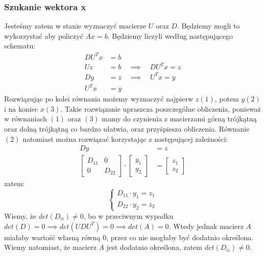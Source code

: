\documentclass{article}
\begin{document}
        \subsubsection*{Szukanie wektora x}
Jesteśmy zatem w stanie wyznaczyć macierze \(U\) oraz \(D\). Będziemy mogli to wykorzystać aby policzyć \(Ax = b\). Będziemy liczyli według następującego schematu:
\vspace*{0.2cm}
\[
    \begin{aligned}
        DU^Tx &= b \\
        Uz &= b \quad \implies \quad DU^Tx = z \\
        Dy &= z \quad \implies \quad U^Tx = y \\
        U^Tx &= y
    \end{aligned}
\]
Rozwiązując po kolei równania możemy wyznaczyć najpierw \(z (1)\), potem \(y (2)\) i na koniec \(x (3)\). Takie rozwiązanie upraszcza poszczególne obliczenia, ponieważ w równaniach \((1)\) oraz \((3)\) mamy do czynienia z macierzami górną trójkątną oraz dolną trójkątną co bardzo ułatwia, oraz przyśpiesza obliczenia. Równanie \((2)\) natomiast można rozwiązać korzystając z następującej zależności:
\[
    \begin{aligned}
        Dy &= z \\
        \begin{bmatrix}
            D_{11} & 0 \\
            0 & D_{22}
        \end{bmatrix}
        \cdot
        \begin{bmatrix}
            y_1 \\
            y_2
        \end{bmatrix}
        &=
        \begin{bmatrix}
            z_1 \\
            z_2
        \end{bmatrix}
    \end{aligned}
\]
zatem:
\[
    \begin{cases}
        D_{11} \cdot y_1 = z_1 \\
        D_{22} \cdot y_2 = z_2
    \end{cases}
\]
Wiemy, że \(det(D_{ii}) \ne 0\), bo w przeciwnym wypadku \(det(D) = 0 \implies det(UDU^T) = 0 \implies det(A) = 0\). Wtedy jednak macierz \(A\) miałaby wartość własną równą 0, przez co nie mogłaby być dodatnio określona. Wiemy natomiast, że macierz \(A\) jest dodatnio określona, zatem \(det(D_{ii}) \ne 0\).
\end{document}
